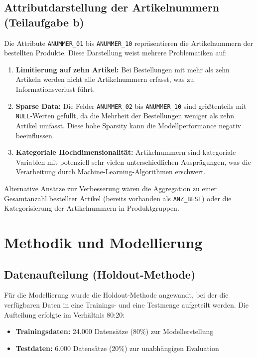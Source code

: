 \subsection{Attributdarstellung der Artikelnummern (Teilaufgabe b)}

Die Attribute \texttt{ANUMMER\_01} bis \texttt{ANUMMER\_10} repräsentieren die 
Artikelnummern der bestellten Produkte. Diese Darstellung weist mehrere Problematiken auf:

\begin{enumerate}
    \item \textbf{Limitierung auf zehn Artikel:} Bei Bestellungen mit mehr als zehn 
    Artikeln werden nicht alle Artikelnummern erfasst, was zu Informationsverlust führt.
    
    \item \textbf{Sparse Data:} Die Felder \texttt{ANUMMER\_02} bis \texttt{ANUMMER\_10} 
    sind größtenteils mit \texttt{NULL}-Werten gefüllt, da die Mehrheit der Bestellungen 
    weniger als zehn Artikel umfasst. Diese hohe Sparsity kann die Modellperformance 
    negativ beeinflussen.
    
    \item \textbf{Kategoriale Hochdimensionalität:} Artikelnummern sind kategoriale 
    Variablen mit potenziell sehr vielen unterschiedlichen Ausprägungen, was die 
    Verarbeitung durch Machine-Learning-Algorithmen erschwert.
\end{enumerate}

Alternative Ansätze zur Verbesserung wären die Aggregation zu einer Gesamtanzahl 
bestellter Artikel (bereits vorhanden als \texttt{ANZ\_BEST}) oder die Kategorisierung 
der Artikelnummern in Produktgruppen.

\section{Methodik und Modellierung}

\subsection{Datenaufteilung (Holdout-Methode)}

Für die Modellierung wurde die Holdout-Methode angewandt, bei der die verfügbaren 
Daten in eine Trainings- und eine Testmenge aufgeteilt werden. Die Aufteilung erfolgte 
im Verhältnis 80:20:
\begin{itemize}
    \item \textbf{Trainingsdaten:} 24.000 Datensätze (80\%) zur Modellerstellung
    \item \textbf{Testdaten:} 6.000 Datensätze (20\%) zur unabhängigen Evaluation
\end{itemize}

